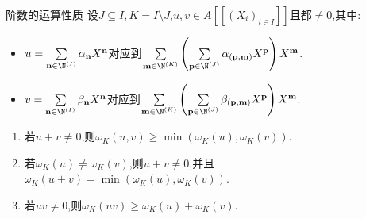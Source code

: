 \begin{proposition}{阶数的运算性质}{}
	设$J\subseteq I,K=I\setminus J$,$u,v\in A\left[\left[\left(X_{i}\right)_{i\in I}\right]\right]$且都$\neq 0$,其中:
	\begin{itemize}
		\item $u=\sum\limits_{\mathbf{n}\in\N^{\left(I\right)}}\alpha_{\mathbf{n}}X^{\mathbf{n}}$对应到$\sum\limits_{\mathbf{m}\in\N^{\left(K\right)}}\left(\sum\limits_{\mathbf{p}\in\N^{\left(J\right)}}\alpha_{\left(\mathbf{p},\mathbf{m}\right)}X^{\mathbf{p}}\right)X^{\mathbf{m}}$.
		\item $v=\sum\limits_{\mathbf{n}\in\N^{\left(I\right)}}\beta_{\mathbf{n}}X^{\mathbf{n}}$对应到$\sum\limits_{\mathbf{m}\in\N^{\left(K\right)}}\left(\sum\limits_{\mathbf{p}\in\N^{\left(J\right)}}\beta_{\left(\mathbf{p},\mathbf{m}\right)}X^{\mathbf{p}}\right)X^{\mathbf{m}}$.
	\end{itemize}
	\begin{enumerate}
		\item 若$u+v\neq 0$,则$\omega_{K}\left(u,v\right)\geq\min\left(\omega_{K}\left(u\right),\omega_{K}\left(v\right)\right)$.
		\item 若$\omega_{K}\left(u\right)\neq\omega_{K}\left(v\right)$,则$u+v\neq 0$,并且$\omega_{K}\left(u+v\right)=\min\left(\omega_{K}\left(u\right),\omega_{K}\left(v\right)\right)$.
		\item 若$uv\neq 0$,则$\omega_{K}\left(uv\right)\geq\omega_{K}\left(u\right)+\omega_{K}\left(v\right)$.
	\end{enumerate}
\end{proposition}


































































